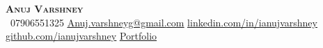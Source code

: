 \begin{center}
    \textbf{\Huge \scshape Anuj Varshney} \\ \vspace{1pt}
     \ \small 07906551325 \quad
    \href{mailto:Anuj.varshneyg@gmail.com}{ \underline{Anuj.varshneyg@gmail.com}} \quad
    \href{https://www.linkedin.com/in/ianujvarshney}{ \underline{linkedin.com/in/ianujvarshney}} \quad
    \href{https://github.com/ianujvarshney}{ \underline{github.com/ianujvarshney}} \quad
    \href{https://anuj-varshney.vercel.app/}{ \underline{Portfolio}}
\end{center}